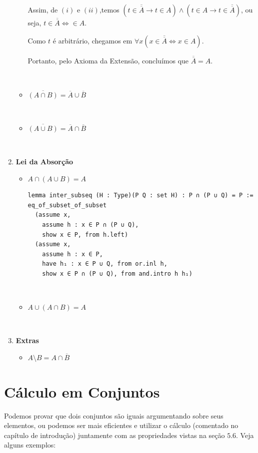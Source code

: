 \begin{enumerate}
\begin{itemize}
Assim, de $(i)$ e $(ii)$,temos $  (t \in \overline {\overline {A}} \rightarrow t \in A) \wedge (t \in {A} \rightarrow t \in \overline {\overline{A}} )$, ou seja, $t \in \overline {\overline {A}} \iff \in A $.

Como $t$ é arbitrário, chegamos em $\forall x (x \in \overline {\overline {A}} \iff x \in A) $.

Portanto, pelo Axioma da Extensão, concluímos que $\overline {\overline {A}} = A$.

$\qquad$

\item $\overline{(A \cap B)} = \overline A \cup \overline B$

$\qquad$

\item $\overline{(A \cup B)} = \overline A \cap \overline B$
\end{itemize}

$\qquad$

\item{\textbf{Lei da Absorção}}
\begin{itemize}
\item $A \cap (A \cup B) = A$

\begin{lstlisting}
lemma inter_subseq (H : Type)(P Q : set H) : P ∩ (P ∪ Q) = P :=
eq_of_subset_of_subset
  (assume x,
    assume h : x ∈ P ∩ (P ∪ Q),
    show x ∈ P, from h.left)
  (assume x,
    assume h : x ∈ P,
    have h₁ : x ∈ P ∪ Q, from or.inl h,
    show x ∈ P ∩ (P ∪ Q), from and.intro h h₁)\end{lstlisting}

$\qquad$

\item $A \cup (A \cap B) = A$
\end{itemize}

$\qquad$

\item{\textbf{Extras}}
\begin{itemize}
\item $A \setminus B = A \cap \overline B$
\end{itemize}
\end{enumerate}

\section{Cálculo em Conjuntos}
Podemos provar que dois conjuntos são iguais argumentando sobre seus elementos, ou podemos ser mais eficientes e utilizar o cálculo (comentado no capítulo de introdução) juntamente com as propriedades vistas na seção $5.6$. Veja alguns exemplos:

